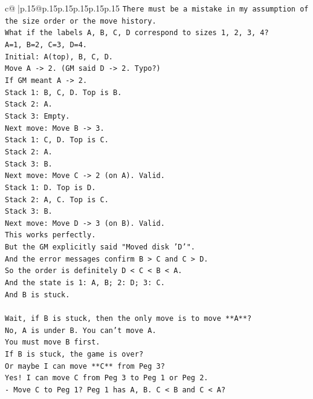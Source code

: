 \documentclass{article}
\begin{document}
{\begin{supertabular}{c@{$\;$}|p{.15\linewidth}@{}p{.15\linewidth}p{.15\linewidth}p{.15\linewidth}p{.15\linewidth}p{.15\linewidth}}
{{{\texttt{There must be a mistake in my assumption of the size order or the move history.} \\
\texttt{What if the labels A, B, C, D correspond to sizes 1, 2, 3, 4?} \\
\texttt{A=1, B=2, C=3, D=4.} \\
\texttt{Initial: A(top), B, C, D.} \\
\texttt{Move A {-}> 2. (GM said D {-}> 2. Typo?)} \\
\texttt{If GM meant A {-}> 2.} \\
\texttt{Stack 1: B, C, D. Top is B.} \\
\texttt{Stack 2: A.} \\
\texttt{Stack 3: Empty.} \\
\texttt{Next move: Move B {-}> 3.} \\
\texttt{Stack 1: C, D. Top is C.} \\
\texttt{Stack 2: A.} \\
\texttt{Stack 3: B.} \\
\texttt{Next move: Move C {-}> 2 (on A). Valid.} \\
\texttt{Stack 1: D. Top is D.} \\
\texttt{Stack 2: A, C. Top is C.} \\
\texttt{Stack 3: B.} \\
\texttt{Next move: Move D {-}> 3 (on B). Valid.} \\
\texttt{This works perfectly.} \\
\texttt{But the GM explicitly said "Moved disk 'D'".} \\
\texttt{And the error messages confirm B > C and C > D.} \\
\texttt{So the order is definitely D < C < B < A.} \\
\texttt{And the state is 1: A, B; 2: D; 3: C.} \\
\texttt{And B is stuck.} \\
\\ 
\texttt{Wait, if B is stuck, then the only move is to move **A**?} \\
\texttt{No, A is under B. You can't move A.} \\
\texttt{You must move B first.} \\
\texttt{If B is stuck, the game is over?} \\
\texttt{Or maybe I can move **C** from Peg 3?} \\
\texttt{Yes! I can move C from Peg 3 to Peg 1 or Peg 2.} \\
\texttt{{-} Move C to Peg 1? Peg 1 has A, B. C < B and C < A?} \\
}}}
\end{supertabular}}
\end{document}
